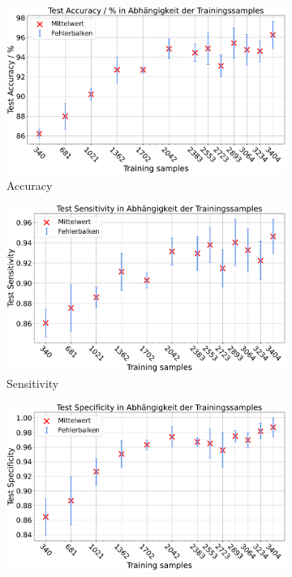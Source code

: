 \begin{figure}[H]
  \centering
  \begin{subfigure}[b]{0.48\textwidth}
    \includegraphics[width=\textwidth]{plots/2-Messungen-noTu-Tu_Accuracy_mean.pdf}
    \caption{Accuracy}
    \label{fig:reduzierung_accuracy}
  \end{subfigure}
  \begin{subfigure}[b]{0.48\textwidth}
    \includegraphics[width=\textwidth]{plots/2-Messungen-noTu-Tu_Sensitivity_mean.pdf}
    \caption{Sensitivity}
    \label{fig:reduzierung_sensitivity}
  \end{subfigure}
  \begin{subfigure}[b]{0.48\textwidth}
    \includegraphics[width=\textwidth]{plots/2-Messungen-noTu-Tu_Specificity_mean.pdf}

\end{subfigure}
\end{figure}
